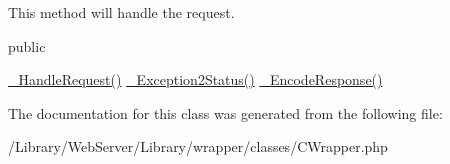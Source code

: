 This method will handle the request.

public

\hyperlink{class_c_wrapper_a12c1dd1f1d1cf0ae889cc19ff17ced0e}{\-\_\-\-Handle\-Request()}  \hyperlink{class_c_wrapper_ad8dd05c155df0d8fe19be35d4bb67b56}{\-\_\-\-Exception2\-Status()}  \hyperlink{class_c_wrapper_a60583bacf329d484d01df9851602759f}{\-\_\-\-Encode\-Response()} 

The documentation for this class was generated from the following file\-:\begin{DoxyCompactItemize}
\item 
/\-Library/\-Web\-Server/\-Library/wrapper/classes/C\-Wrapper.\-php\end{DoxyCompactItemize}
